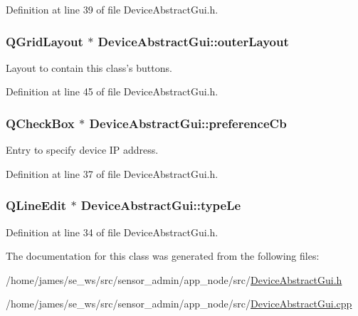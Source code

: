 Definition at line 39 of file Device\-Abstract\-Gui.\-h.

\hypertarget{class_device_abstract_gui_ac67bec58281fcf0ba961fcacddcdf961}{
\subsubsection[{outer\-Layout}]{\setlength{\rightskip}{0pt plus 5cm}Q\-Grid\-Layout $\ast$ Device\-Abstract\-Gui\-::outer\-Layout\hspace{0.3cm}{\ttfamily [private]}}}\label{class_device_abstract_gui_ac67bec58281fcf0ba961fcacddcdf961}
Layout to contain this class's buttons. 

Definition at line 45 of file Device\-Abstract\-Gui.\-h.

\hypertarget{class_device_abstract_gui_a22b9e8623893c403d352c55110f08a27}{
\subsubsection[{preference\-Cb}]{\setlength{\rightskip}{0pt plus 5cm}Q\-Check\-Box $\ast$ Device\-Abstract\-Gui\-::preference\-Cb\hspace{0.3cm}{\ttfamily [private]}}}\label{class_device_abstract_gui_a22b9e8623893c403d352c55110f08a27}
Entry to specify device I\-P address. 

Definition at line 37 of file Device\-Abstract\-Gui.\-h.

\hypertarget{class_device_abstract_gui_a6f430740086db96453346b28d76a22c1}{
\subsubsection[{type\-Le}]{\setlength{\rightskip}{0pt plus 5cm}Q\-Line\-Edit $\ast$ Device\-Abstract\-Gui\-::type\-Le\hspace{0.3cm}{\ttfamily [private]}}}\label{class_device_abstract_gui_a6f430740086db96453346b28d76a22c1}


Definition at line 34 of file Device\-Abstract\-Gui.\-h.



The documentation for this class was generated from the following files\-:\begin{DoxyCompactItemize}
\item 
/home/james/se\-\_\-ws/src/sensor\-\_\-admin/app\-\_\-node/src/\hyperlink{app__node_2src_2_device_abstract_gui_8h}{Device\-Abstract\-Gui.\-h}\item 
/home/james/se\-\_\-ws/src/sensor\-\_\-admin/app\-\_\-node/src/\hyperlink{app__node_2src_2_device_abstract_gui_8cpp}{Device\-Abstract\-Gui.\-cpp}\end{DoxyCompactItemize}
